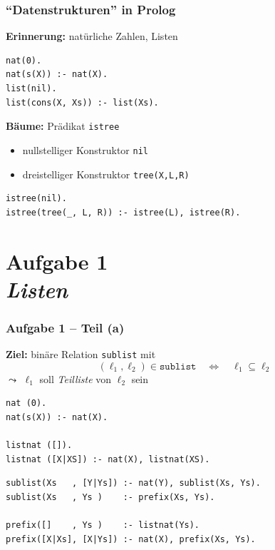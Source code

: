 \documentclass{beamer}
\begin{document}
\begin{frame}[fragile] \frametitle{\enquote{Datenstrukturen} in Prolog}
	\footnotesize
	
	\textbf{Erinnerung:} natürliche Zahlen, Listen
	
	\begin{lstlisting}
nat(0).
nat(s(X)) :- nat(X).
list(nil).
list(cons(X, Xs)) :- list(Xs).
	\end{lstlisting}
	
	\textbf{Bäume:} Prädikat \texttt{istree}
	\vspace{-0.5em}
	\begin{itemize} \footnotesize
		\item nullstelliger Konstruktor \texttt{nil}
		\item dreistelliger Konstruktor \texttt{tree(X,L,R)} 
	\end{itemize}
	
	\begin{lstlisting}[firstnumber=5]
istree(nil).
istree(tree(_, L, R)) :- istree(L), istree(R).
	\end{lstlisting}
\end{frame}




\section{Aufgabe 1 \\ \itshape \normalsize Listen}

\begin{frame}[fragile] \frametitle{Aufgabe 1 -- Teil (a)}
	\footnotesize
	
	\textbf{Ziel:} binäre Relation \texttt{sublist} mit 
	\begin{equation*}
		(\ell_1 , \ell_2) \in \texttt{sublist} 
		\quad \Leftrightarrow \quad
		\ell_1 \subseteq \ell_2
	\end{equation*}
	$\leadsto$ $\ell_1$ soll \textit{Teilliste} von $\ell_2$ sein
	
	\begin{lstlisting}
nat (0).
nat(s(X)) :- nat(X).

listnat ([]).
listnat ([X|XS]) :- nat(X), listnat(XS).

	\end{lstlisting}
	\pause
	\begin{lstlisting}[firstnumber=6]
sublist(Xs   , [Y|Ys]) :- nat(Y), sublist(Xs, Ys). 
sublist(Xs   , Ys )    :- prefix(Xs, Ys). 

prefix([]    , Ys )    :- listnat(Ys). 
prefix([X|Xs], [X|Ys]) :- nat(X), prefix(Xs, Ys).
	\end{lstlisting}
\end{frame}
\end{document}
